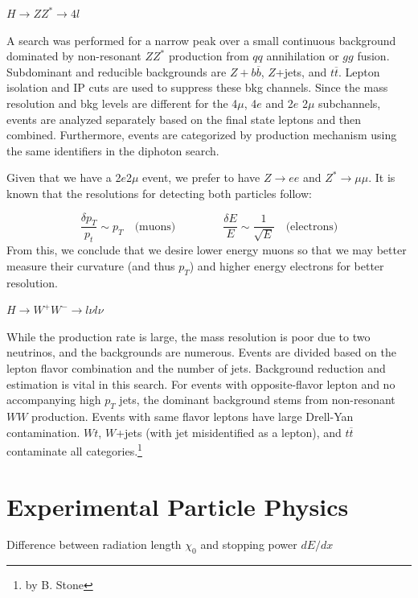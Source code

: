 \vspace{1em}
\noindent \underline{$H \rightarrow ZZ^* \rightarrow 4l$}

\vspace{1em}
\noindent A search was performed for a narrow peak over a small continuous background dominated by non-resonant $ZZ^*$ production from $qq$ annihilation or $gg$ fusion. Subdominant and reducible backgrounds are $Z+b \overline{b}$, $Z$+jets, and $t \overline{t}$. Lepton isolation and IP cuts are used to suppress these bkg channels. Since the mass resolution and bkg levels are different for the 4$\mu$, 4$e$ and 2$e$ 2$\mu$ subchannels, events are analyzed separately based on the final state leptons and then combined. Furthermore, events are categorized by production mechanism using the same identifiers in the diphoton search.

\vspace{1em}
\noindent Given that we have a 2$e$2$\mu$ event, we prefer to have $Z \rightarrow ee$ and $Z^* \rightarrow \mu \mu$. It is known that the resolutions for detecting both particles follow:


\begin{equation}
\frac{\delta p_T}{p_t} \sim p_T \quad \text{(muons)} \qquad \qquad \
\frac{\delta E}{E} \sim \frac{1}{\sqrt{E}} \quad \text{(electrons)}
\end{equation}
From this, we conclude that we desire lower energy muons so that we may better measure their curvature (and thus $p_T$) and higher energy electrons for better resolution.

\vspace{1em}
\noindent \underline{$H \rightarrow W^+W^- \rightarrow l \nu l \nu$}

\vspace{1em}
\noindent While the production rate is large, the mass resolution is poor due to two neutrinos, and the backgrounds are numerous. Events are divided based on the lepton flavor combination and the number of jets. Background reduction and estimation is vital in this search. For events with opposite-flavor lepton and no accompanying high $p_T$ jets, the dominant background stems from non-resonant $WW$ production. Events with same flavor leptons have large Drell-Yan contamination. $Wt$, $W$+jets (with jet misidentified as a lepton), and $t\overline{t}$ contaminate all categories.\footnote{by B. Stone} 


\chapter{Experimental Particle Physics}
Difference between radiation length $\chi_0$ and stopping power $dE/dx$

